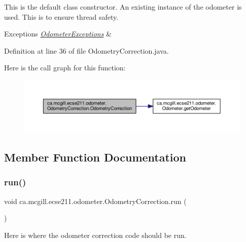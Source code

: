 This is the default class constructor. An existing instance of the odometer is used. This is to ensure thread safety.


\begin{DoxyExceptions}{Exceptions}
{\em \hyperlink{classca_1_1mcgill_1_1ecse211_1_1odometer_1_1_odometer_exceptions}{Odometer\+Exceptions}} & \\
\hline
\end{DoxyExceptions}


Definition at line 36 of file Odometry\+Correction.\+java.

Here is the call graph for this function\+:\nopagebreak
\begin{figure}[H]
\begin{center}
\leavevmode
\includegraphics[width=350pt]{classca_1_1mcgill_1_1ecse211_1_1odometer_1_1_odometry_correction_ad80b45e0bc4bf935494e075edcec739c_cgraph}
\end{center}
\end{figure}


\subsection{Member Function Documentation}
\mbox{\label{classca_1_1mcgill_1_1ecse211_1_1odometer_1_1_odometry_correction_aad66a7030ac00f3a9cbe7bc33c25acbf}} 
\subsubsection{\texorpdfstring{run()}{run()}}
{\footnotesize\ttfamily void ca.\+mcgill.\+ecse211.\+odometer.\+Odometry\+Correction.\+run (\begin{DoxyParamCaption}{ }\end{DoxyParamCaption})}

Here is where the odometer correction code should be run.


